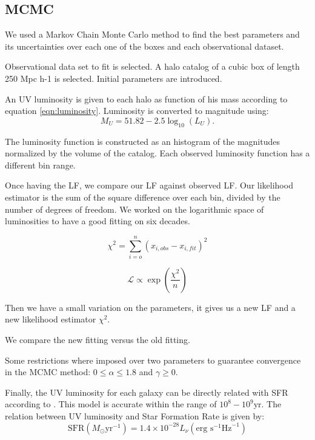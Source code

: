 \subsection{MCMC}
We used a Markov Chain Monte Carlo method to find the best parameters and its 
uncertainties over each one of the boxes and each observational dataset.

Observational data set to fit is selected.
A halo catalog of a cubic box of length 250 Mpc h-1 is selected.
Initial parameters are introduced.

An UV luminosity is given to each halo as function of his mass according to equation
 \ref{eqn:luminosity}.
Luminosity is converted to magnitude using:
  \[ M_{U} = 51.82 - 2.5 \log_{10}(L_{U}). \]

The luminosity function is constructed as an histogram of the magnitudes normalized by 
the volume of the catalog. Each observed luminosity function has a different bin range.

Once having the LF, we compare our LF against observed LF. Our likelihood estimator is 
the sum of the square difference over each bin, divided by the number of degrees of 
freedom. We worked on the logarithmic space of luminosities to have a good fitting on
six decades.

\[ \chi^2  = \sum_{i=o}^{n}\left( x_{i,obs} - x_{i,fit} \right)^2 \]


\[ \mathcal{L} \propto \exp \left( \frac{\chi ^2}{n} \right) \]

Then we have a small variation on the parameters, it gives us a new LF and a new 
likelihood estimator $\chi^2$. 

We compare the new fitting versus the old fitting.



Some restrictions where imposed over two parameters to guarantee convergence in the 
MCMC method: $0 \leq \alpha \leq 1.8 $  and $\gamma \geq 0$.







Finally, the UV luminosity for each galaxy can be directly related with SFR according 
to \citet{madau98}.
This model is accurate within the range of $10^8 - 10^9 \textrm{yr}$\citep{kennicutt98}.
The relation between UV luminosity and Star Formation Rate \citep{madau98,kennicutt98} 
is given by:
\begin{equation}
 \textrm{SFR}\left(M_\odot \textrm{yr}^{-1}\right) 
      = 1.4 \times 10^{-28} L_{\nu} \left( \textrm{erg s}^{-1}\textrm{Hz}^{-1} 
	\right)
\end{equation}
